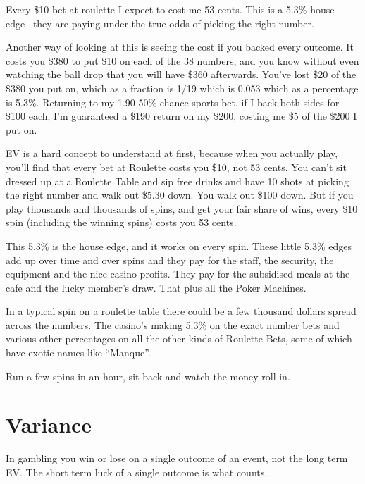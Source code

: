 Every \$10 bet at roulette I expect to cost me 53 cents. This is a 5.3\% house
edge-- they are paying under the true odds of picking the right
number.

Another way of looking at this is seeing the cost if you backed every
outcome. It costs you \$380 to put \$10 on each of the 38 numbers, and
you know without even watching the ball drop that you will have \$360
afterwards. You've lost \$20 of the \$380 you put on, which as a
fraction is 1/19 which is 0.053 which as a percentage is 5.3\%.
Returning to my 1.90 50\% chance sports bet, if I back both sides for
\$100 each, I'm guaranteed a \$190 return on my \$200, costing me \$5
of the \$200 I put on.


EV is a hard concept to understand at first, because when you actually
play, you'll find that every bet at Roulette costs you \$10, not
53 cents. You can't sit dressed up at a Roulette Table and sip free
drinks and have 10 shots at picking the right number and walk out \$5.30
down. You walk out \$100 down. But if you play thousands and thousands
of spins, and get your fair share of wins, every \$10 spin (including
the winning spins) costs you 53 cents.

This 5.3\% is the house edge, and it works on every spin. These little 5.3\%
edges add up over time and over spins and they pay for the staff, the
security, the equipment and the nice casino profits. They pay for the
subsidised meals at the cafe and the lucky member's draw. That plus
all the Poker Machines.

In a typical spin on a roulette table there could be a few thousand dollars
spread across the numbers. The casino's making 5.3\% on the exact number
bets and various other percentages on all the other kinds of Roulette Bets,
some of which have exotic names like ``Manque''.

Run a few spins in an hour, sit back and watch the money roll in.

\section{Variance}

In gambling you win or lose on a single outcome of an event,
not the long term EV. The short term luck of a single outcome
is what counts.

